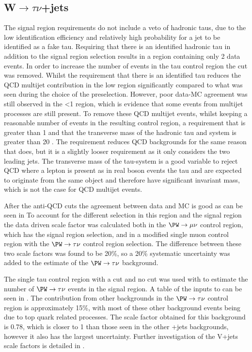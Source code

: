 \subsection{W$\rightarrow \tau\nu$+jets}
\label{sec:parkedwtaunu}
The signal region requirements do not include a veto of hadronic taus, due to the low identification efficiency and relatively high probability for a jet to be identified as a fake tau. Requiring that there is an identified hadronic tau in addition to the signal region selection results in a region containing only 2 data events. In order to increase the number of events in the tau control region the \jetmetdphi cut was removed. Whilst the requirement that there is an identified tau reduces the \ac{QCD} multijet contribution in the low \jetmetdphi region significantly compared to what was seen during the choice of the preselection. However, poor data-\ac{MC} agreement was still observed in the \jetmetdphi<1 region, which is evidence that some events from multijet processes are still present. To remove these \ac{QCD} multijet events, whilst keeping a reasonable number of events in the resulting control region, a requirement that \jetmetdphileading is greater than 1 and that the transverse mass of the hadronic tau and \MET system is greater than 20 \GeV. The \jetmetdphileading requirement reduces \ac{QCD} backgrounds for the same reason that \jetmetdphi does, but it is a slightly looser requirement as it only considers the two leading jets. The transverse mass of the tau-\MET system is a good variable to reject \ac{QCD} where a lepton is present as in real \PW boson events the tau and \MET are expected to originate from the same object and therefore have significant invariant mass, which is not the case for \ac{QCD} multijet events.

After the anti-\ac{QCD} cuts the agreement between data and \ac{MC} is good as can be seen in  To account for the different \jetmetdphi selection in this region and the signal region the data driven scale factor was calculated both in the $\PW\rightarrow\mu\nu$ control region, which has the signal region \jetmetdphi selection, and in a modified single muon control region with the $\PW\rightarrow\tau\nu$ control region \jetmetdphi selection. The difference between these two scale factors was found to be 20\%, so a 20\% systematic uncertainty was added to the estimate of the $\PW\rightarrow\tau\nu$ background.

The single tau control region with a \jetmetdphileading cut and no \jetmetdphi cut was used with  to estimate the number of $\PW\rightarrow\tau\nu$ events in the signal region. A table of the inputs to  can be seen in . The contribution from other backgrounds in the $\PW\rightarrow\tau\nu$ control region is approximately 15\%, with most of these other background events being due to top quark related processes. The scale factor obtained for this background is 0.78, which is closer to 1 than those seen in the other \PW+jets backgrounds, however it also has the largest uncertainty. Further investigation of the V+jets scale factors is detailed in .

